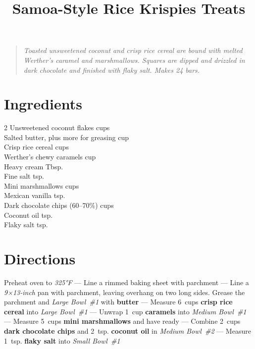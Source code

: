 \documentclass[11pt,letterpaper]{article}
\title{Samoa-Style Rice Krispies Treats}
\author{}
\date{}
\begin{document}
\maketitle
\thispagestyle{empty}

\begin{quote}
\textit{Toasted unsweetened coconut and crisp rice cereal are bound with melted Werther's caramel and marshmallows. Squares are dipped and drizzled in dark chocolate and finished with flaky salt. Makes 24 bars.}
\end{quote}

\section*{Ingredients}
\setlength{\columnsep}{20pt}
\begin{multicols}{2}
\noindent
    Unsweetened coconut flakes  cups \\
    Salted butter, plus more for greasing \dotfill {} cup \\
    Crisp rice cereal  cups \\
    Werther's chewy caramels  cup \\
    Heavy cream  Tbsp. \\
    Fine salt \dotfill {} tsp. \\
    \columnbreak
    Mini marshmallows  cups \\
    Mexican vanilla  tsp. \\
    Dark chocolate chips (60--70\%)  cups \\
    Coconut oil  tsp. \\
    Flaky salt  tsp. \\
\end{multicols}

\section*{Directions}

\noindent
Preheat oven to \textit{325°F} ---
Line a rimmed baking sheet with parchment ---
Line a \textit{9×13-inch} pan with parchment, leaving overhang on two long sides. Grease the parchment and \textit{Large Bowl~\#1} with \textbf{butter} ---
Measure 6~cups \textbf{crisp rice cereal} into \textit{Large Bowl~\#1} ---
Unwrap 1~cup \textbf{caramels} into \textit{Medium Bowl~\#1} ---
Measure 5~cups \textbf{mini marshmallows} and have ready ---
Combine 2~cups \textbf{dark chocolate chips} and 2~tsp. \textbf{coconut oil} in \textit{Medium Bowl~\#2} ---
Measure 1~tsp. \textbf{flaky salt} into \textit{Small Bowl~\#1}
\end{document}
